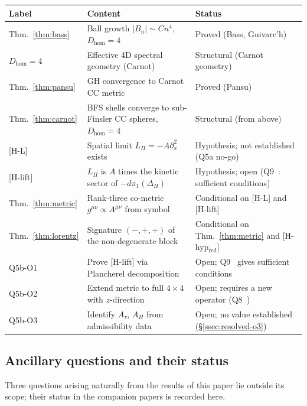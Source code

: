 \documentclass[11pt,a4paper]{article}
\theoremstyle{definition}
\theoremstyle{remark}
\newcommand{\DeltaH}{\Delta_H}
\newcommand{\LPi}{L_\Pi}
\newcommand{\Bn}{B_n}
\newcommand{\Dhom}{D_{\mathrm{hom}}}
\begin{document}
    \begin{center}
      \begin{tabular}{p{3.2cm}p{6.0cm}p{4.8cm}}
        \hline
        Label & Content & Status \\
        \hline
        Thm.~\ref{thm:bass} & Ball growth $|\Bn| \sim C n^4$, $\Dhom = 4$ &
        Proved (Bass, Guivarc'h) \\
        $\Dhom = 4$ & Effective 4D spectral geometry (Carnot) &
        Structural (Carnot geometry) \\
        Thm.~\ref{thm:pansu} & GH convergence to Carnot CC metric &
        Proved (Pansu) \\
        Thm.~\ref{thm:carnot} & BFS shells converge to sub-Finsler CC spheres, $\Dhom = 4$ &
        Structural (from above) \\
        {[H-L]} & Spatial limit $\LPi = -A\partial_x^2$ exists &
        Hypothesis; not established (Q5a no-go) \\
        {[H-lift]} & $\LPi$ is $A$ times the kinetic sector of $-d\pi_1(\DeltaH)$ &
        Hypothesis; open (Q9~\cite{Beau2026q9}: sufficient conditions) \\
        Thm.~\ref{thm:metric} & Rank-three co-metric $g^{\mu\nu} \propto A^{\mu\nu}$ from symbol &
        Conditional on [H-L] and [H-lift] \\
        Thm.~\ref{thm:lorentz} & Signature $(-,+,+)$ of the non-degenerate block &
        Conditional on Thm.~\ref{thm:metric} and [H-hyp$_{\mathrm{red}}$] \\
        \hline
        Q5b-O1 & Prove [H-lift] via Plancherel decomposition &
        Open; Q9~\cite{Beau2026q9} gives sufficient conditions \\
        Q5b-O2 & Extend metric to full $4\times 4$ with $z$-direction &
        Open; requires a new operator (Q8~\cite{BeauQ8}) \\
        Q5b-O3 & Identify $A_\tau$, $A_H$ from admissibility data &
        Open; no value established (\S\ref{ssec:resolved-o3}) \\
        \hline
      \end{tabular}
    \end{center}

  \subsection{Ancillary questions and their status}

    Three questions arising naturally from the results of this paper lie outside its scope; their status in the
    companion papers is recorded here.
\end{document}
